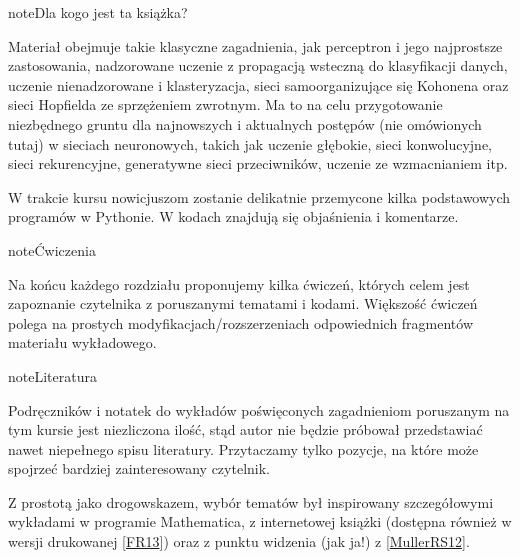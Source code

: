 \documentclass[a4paper,12pt,polish]{jupyterBook}
\begin{document}
\begin{sphinxadmonition}{note}{Dla kogo jest ta książka?}

\sphinxAtStartPar
{}
\end{sphinxadmonition}

\sphinxAtStartPar
Materiał obejmuje takie klasyczne zagadnienia, jak perceptron i jego najprostsze zastosowania, nadzorowane uczenie z propagacją wsteczną do klasyfikacji danych, uczenie nienadzorowane i klasteryzacja, sieci samoorganizujące się Kohonena oraz sieci Hopfielda ze sprzężeniem zwrotnym. Ma to na celu przygotowanie niezbędnego gruntu dla najnowszych i aktualnych postępów (nie omówionych tutaj) w sieciach neuronowych, takich jak uczenie głębokie, sieci konwolucyjne, sieci rekurencyjne, generatywne sieci przeciwników, uczenie ze wzmacnianiem itp.

\sphinxAtStartPar
W trakcie kursu nowicjuszom zostanie delikatnie przemycone kilka podstawowych programów w Pythonie. W kodach znajdują się objaśnienia i komentarze.

\begin{sphinxadmonition}{note}{Ćwiczenia}

\sphinxAtStartPar
Na końcu każdego rozdziału proponujemy kilka ćwiczeń, których celem jest zapoznanie czytelnika z poruszanymi tematami i kodami. Większość ćwiczeń polega na prostych modyfikacjach/rozszerzeniach odpowiednich fragmentów materiału wykładowego.
\end{sphinxadmonition}

\begin{sphinxadmonition}{note}{Literatura}

\sphinxAtStartPar
Podręczników i notatek do wykładów poświęconych zagadnieniom poruszanym na tym kursie jest niezliczona ilość, stąd autor nie będzie próbował przedstawiać nawet niepełnego spisu literatury. Przytaczamy tylko pozycje, na które może spojrzeć bardziej zainteresowany czytelnik.
\end{sphinxadmonition}

\sphinxAtStartPar
Z prostotą jako drogowskazem, wybór tematów był inspirowany szczegółowymi wykładami  w programie Mathematica, z internetowej książki  (dostępna również w wersji drukowanej {[}\hyperlink{cite.docs/conclusion:id8}{FR13}{]}) oraz z punktu widzenia  (jak ja!) z {[}\hyperlink{cite.docs/conclusion:id7}{MullerRS12}{]}.
\end{document}
